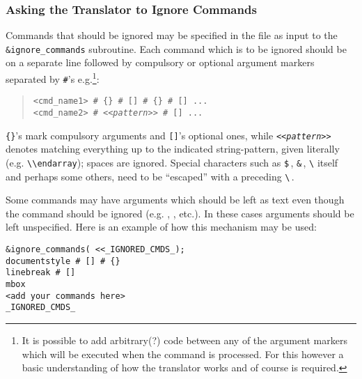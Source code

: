 \subsubsection{Asking the Translator to Ignore Commands\label{ignore}}
\html{\\}%
Commands that should be ignored may be specified in the 
file as input to the \verb|&ignore_commands| subroutine. 
Each command which is to be ignored should be on a separate line 
followed by compulsory or optional argument markers separated by 
{\verb|#|}'s e.g.\footnote{It is possible to add arbitrary(?) \Perl{} code
between any of the argument markers which will be executed when 
the command is processed. For this however a basic understanding of
how the translator works and of course \Perl{} is required.}:
\begin{quote}
\begin{small}
\verb|<cmd_name1> # {} # [] # {} # [] ...|\\
\verb|<cmd_name2> # |\texttt{<<\emph{pattern}>>}\verb| # [] ...|
\end{small}
\end{quote}
\verb|{}|'s mark compulsory arguments and \verb|[]|'s optional ones,
while \texttt{<<\emph{pattern}>>} denotes matching everything up to the
indicated string-pattern, given literally (e.g. \verb|\\endarray|);
spaces are ignored. Special characters
such as \verb|$|\,, \verb|&|\,, \verb|\| itself and perhaps some others,
need to be ``escaped'' with a preceding \verb|\|\,.


\html{\\}%

Some commands may have arguments which should be left as text even
though the command should be ignored 
(e.g. , , etc.). 
In these cases arguments should be left unspecified.
Here is an example of how this mechanism may be used:
\begin{small}
\begin{verbatim}
&ignore_commands( <<_IGNORED_CMDS_);
documentstyle # [] # {}
linebreak # []
mbox
<add your commands here>
_IGNORED_CMDS_
\end{verbatim}
\end{small}


